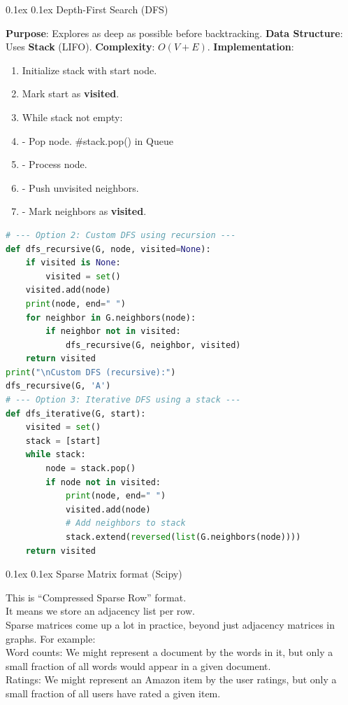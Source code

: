 \documentclass[8pt,landscape]{article}
\makeatletter
\renewcommand{\subsection}{\@startsection{subsection}{2}{0pt}%
    {0.1ex}%
    {0.1ex}%
    {\fontsize{8}{9}\bfseries\color{blue}}} %
\newcommand{\smalltext}[1]{%
  {\fontsize{8}{9}\selectfont\sloppy #1\par}%
}
\makeatother
\begin{document}
\begin{multicols}{3}
\subsection{Depth-First Search (DFS)}
\smalltext{
\textbf{Purpose}: Explores as deep as possible before backtracking.
\textbf{Data Structure}: Uses \textbf{Stack} (LIFO).
\textbf{Complexity}: $O(V+E)$.
\textbf{Implementation}:
\begin{enumerate}[noitemsep, nolistsep, leftmargin=1em]
    \item Initialize stack with start node.
    \item Mark start as \textbf{visited}.
    \item While stack not empty:
    \item \hspace{0.5em}- Pop node. \#stack.pop() in Queue
    \item \hspace{0.5em}- Process node.
    \item \hspace{0.5em}- Push unvisited neighbors.
    \item \hspace{0.5em}- Mark neighbors as \textbf{visited}.
\end{enumerate}
}
\begin{lstlisting}[language=Python]
# --- Option 2: Custom DFS using recursion ---
def dfs_recursive(G, node, visited=None):
    if visited is None:
        visited = set()
    visited.add(node)
    print(node, end=" ")
    for neighbor in G.neighbors(node):
        if neighbor not in visited:
            dfs_recursive(G, neighbor, visited)
    return visited
print("\nCustom DFS (recursive):")
dfs_recursive(G, 'A')
# --- Option 3: Iterative DFS using a stack ---
def dfs_iterative(G, start):
    visited = set()
    stack = [start]
    while stack:
        node = stack.pop()
        if node not in visited:
            print(node, end=" ")
            visited.add(node)
            # Add neighbors to stack
            stack.extend(reversed(list(G.neighbors(node))))
    return visited
\end{lstlisting}

\subsection{Sparse Matrix format (Scipy)}
\smalltext{
  This is “Compressed Sparse Row” format. \\
  It means we store an adjacency list per row. \\
  Sparse matrices come up a lot in practice, beyond just adjacency matrices in graphs. For example: \\
Word counts: We might represent a document by the words in it, but only a small fraction of all words would appear in a given document. \\
Ratings: We might represent an Amazon item by the user ratings, but only a small fraction of all users have rated a given item. \\
}


\end{multicols}
\end{document}
